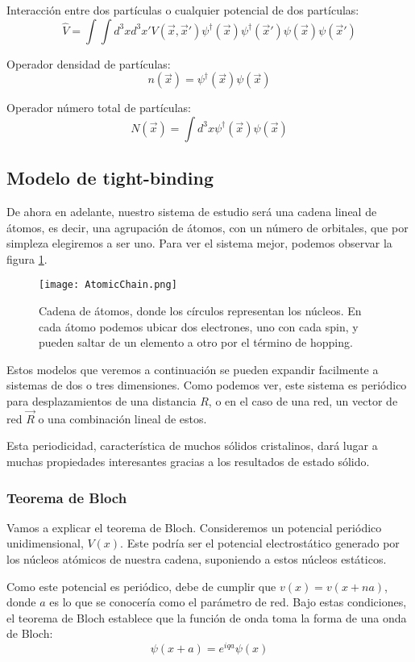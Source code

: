 \documentclass[12pt,twoside]{article}
\begin{document}
Interacción entre dos partículas o cualquier potencial de dos partículas:
$$
\hat{V} = \int \int d^3xd^3x' V(\vec{x}, \vec{x}') \psi^{\dagger} (\vec{x}) \psi^{\dagger} (\vec{x}') \psi(\vec{x}) \psi(\vec{x}')
$$

Operador densidad de partículas:
$$
n(\vec{x}) = \psi^{\dagger} (\vec{x}) \psi(\vec{x})
$$

Operador número total de partículas:
$$
N(\vec{x}) = \int d^3x \psi^{\dagger} (\vec{x}) \psi(\vec{x})
$$
\subsection{Modelo de tight-binding}

De ahora en adelante, nuestro sistema de estudio será una cadena lineal de átomos, es decir, una agrupación de átomos, con un número de orbitales, que por simpleza elegiremos a ser uno. Para ver el sistema mejor, podemos observar la figura \ref{fig:TBChain}.
\begin{figure}[h!]
  \begin{center}
    \texttt{[image: AtomicChain.png]}
    \caption{Cadena de átomos, donde los círculos representan los núcleos. En cada átomo podemos ubicar dos electrones, uno con cada spin, y pueden saltar de un elemento a otro por el término de hopping.}
    \label{fig:TBChain}
  \end{center}
\end{figure}

Estos modelos que veremos a continuación se pueden expandir facilmente a sistemas de dos o tres dimensiones. Como podemos ver, este sistema es periódico para desplazamientos de una distancia $R$, o en el caso de una red, un vector de red $\vec{R}$ o una combinación lineal de estos.

Esta periodicidad, característica de muchos sólidos cristalinos, dará lugar a muchas propiedades interesantes gracias a los resultados de estado sólido.
\subsubsection{Teorema de Bloch}

Vamos a explicar el teorema de Bloch. Consideremos un potencial periódico unidimensional, $V(x)$. Este podría ser el potencial electrostático generado por los núcleos atómicos de nuestra cadena, suponiendo a estos núcleos estáticos.

Como este potencial es periódico, debe de cumplir que $v(x) = v(x +na)$, donde $a$ es lo que se conocería como el parámetro de red. Bajo estas condiciones, el teorema de Bloch establece que la función de onda toma la forma de una onda de Bloch:
\begin{equation}
  \psi(x+a)=e^{iqa}\psi(x)
\end{equation}
\end{document}
